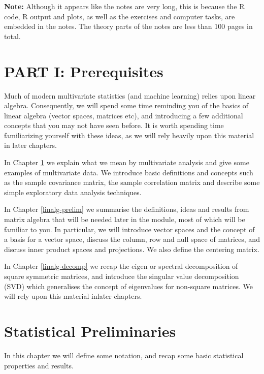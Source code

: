 \documentclass[
]{book}
\theoremstyle{definition}
\theoremstyle{definition}
\theoremstyle{definition}
\theoremstyle{definition}
\theoremstyle{remark}
\begin{document}
\textbf{Note:} Although it appears like the notes are very long, this is because the R code, R output and plots, as well as the exercises and computer tasks, are embedded in the notes. The theory parts of the notes are less than 100 pages in total.

\hypertarget{part-i-prerequisites}{%
\chapter*{PART I: Prerequisites}\label{part-i-prerequisites}}

Much of modern multivariate statistics (and machine learning) relies upon linear algebra. Consequently, we will spend some time reminding you of the basics of linear algebra (vector spaces, matrices etc), and introducing a few additional concepts that you may not have seen before. It is worth spending time familiarizing yourself with these ideas, as we will rely heavily upon this material in later chapters.

In Chapter \ref{stat-prelim} we explain what we mean by multivariate analysis and give some examples of multivariate data. We introduce basic definitions and concepts such as the sample covariance matrix, the sample correlation matrix and describe some simple exploratory data analysis techniques.

In Chapter \ref{linalg-prelim} we summarise the definitions, ideas and results from matrix algebra that will be needed later in the module, most of which will be familiar to you. In particular, we will introduce vector spaces and the concept of a basis for a vector space, discuss the column, row and null space of matrices, and discuss inner product spaces and projections. We also define the centering matrix.

In Chapter \ref{linalg-decomp} we recap the eigen or spectral decomposition of square symmetric matrices, and introduce the singular value decomposition (SVD) which generalises the concept of eigenvalues for non-square matrices. We will rely upon this material inlater chapters.

\hypertarget{stat-prelim}{%
\chapter{Statistical Preliminaries}\label{stat-prelim}}

In this chapter we will define some notation, and recap some basic statistical properties and results.
\end{document}
